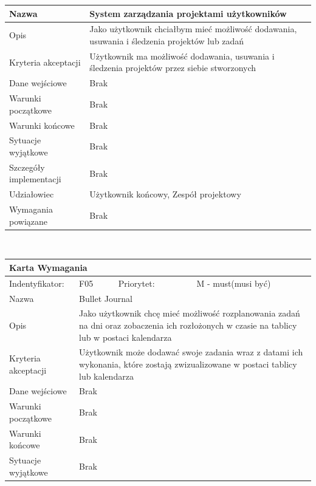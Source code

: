 \documentclass[a4paper,11pt]{report}
\begin{document}
\begin{itemize}
\begin{itemize}
\begin{tabular}{|p{3cm}|p{2cm}|p{2cm}|p{6cm}|}
		\hline
		Nazwa & \multicolumn{3}{|p{10 cm}|}{System zarządzania projektami użytkowników}\\
		\hline
		Opis & \multicolumn{3}{|p{10 cm}|}{Jako użytkownik chciałbym mieć możliwość dodawania, usuwania i śledzenia projektów lub zadań}\\
		\hline
		Kryteria akceptacji & \multicolumn{3}{|p{10 cm}|}{Użytkownik ma możliwość dodawania, usuwania i śledzenia projektów przez siebie stworzonych}\\
		\hline
		Dane wejściowe & \multicolumn{3}{|p{10 cm}|}{Brak}\\
		\hline
		Warunki początkowe & \multicolumn{3}{|p{10 cm}|}{Brak}\\
		\hline
		Warunki końcowe & \multicolumn{3}{|p{10 cm}|}{Brak}\\
		\hline
		Sytuacje wyjątkowe & \multicolumn{3}{|p{10 cm}|}{Brak}\\
		\hline
		Szczegóły implementacji & \multicolumn{3}{|p{10 cm}|}{Brak}\\
		\hline
		Udziałowiec & \multicolumn{3}{|p{10 cm}|}{Użytkownik końcowy, Zespół projektowy}\\
		\hline
		Wymagania powiązane & \multicolumn{3}{|p{10 cm}|}{Brak}\\
		\hline
		\end{tabular}\\
		\begin{tabular}{|p{3cm}|p{2cm}|p{2cm}|p{6cm}|}
		\hline
		\multicolumn{4}{|p{12 cm}|}{Karta Wymagania}\\
		\hline
		Indentyfikator: & F05 & Priorytet: & M - must(musi być)\\
		\hline
		Nazwa & \multicolumn{3}{|p{10 cm}|}{Bullet Journal}\\
		\hline
		Opis & \multicolumn{3}{|p{10 cm}|}{Jako użytkownik chcę mieć możliwość rozplanowania zadań na dni oraz zobaczenia ich rozłożonych w czasie na tablicy lub w postaci kalendarza}\\
		\hline
		Kryteria akceptacji & \multicolumn{3}{|p{10 cm}|}{Użytkownik może dodawać swoje zadania wraz z datami ich wykonania, które zostają zwizualizowane w postaci tablicy lub kalendarza}\\
		\hline
		Dane wejściowe & \multicolumn{3}{|p{10 cm}|}{Brak}\\
		\hline
		Warunki początkowe & \multicolumn{3}{|p{10 cm}|}{Brak}\\
		\hline
		Warunki końcowe & \multicolumn{3}{|p{10 cm}|}{Brak}\\
		\hline
		Sytuacje wyjątkowe & \multicolumn{3}{|p{10 cm}|}{Brak}\\

\end{tabular}
\end{itemize}
\end{itemize}
\end{document}
